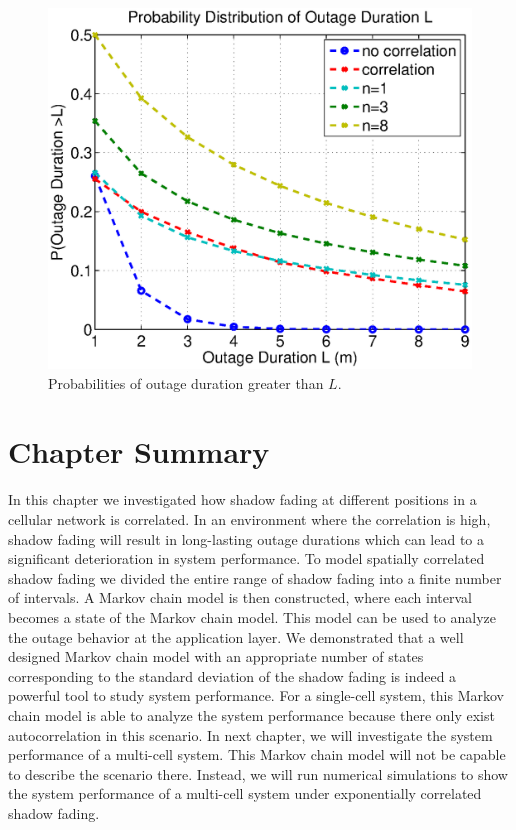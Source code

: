 \begin{figure}
\centering
\includegraphics[width=12cm]{result_Plot_new.eps}
\caption{Probabilities of outage duration greater than $L$.}
\label{prob}
\end{figure}

\section{Chapter Summary}
\label{sec:conclusion}
\par In this chapter we investigated how shadow fading at different positions in a cellular network is correlated. In an environment where the correlation is high, shadow fading will result in long-lasting outage durations which can lead to a significant deterioration in system performance. To model spatially correlated shadow fading we divided the entire range of shadow fading into a finite number of intervals. A Markov chain model is then constructed, where each interval becomes a state of the Markov chain model. This model can be used to analyze the  outage behavior at the application layer. We demonstrated that a well designed Markov chain model with an appropriate number of states corresponding to the standard deviation of the shadow fading is indeed a powerful tool to study system performance. For a single-cell system, this Markov chain model is able to analyze the system performance because there only exist autocorrelation in this scenario. In next chapter, we will investigate the system performance of a multi-cell system. This Markov chain model will not be capable to describe the scenario there. Instead, we will run numerical simulations to show the system performance of a multi-cell system under exponentially correlated shadow fading.
